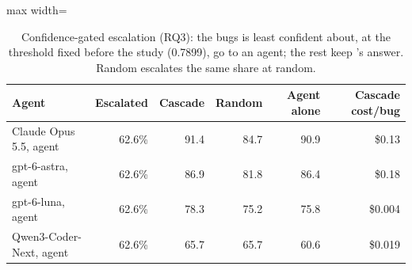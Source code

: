 \begin{table}[t]
\centering
\small
\caption{Confidence-gated escalation (RQ3): the bugs \tool{} is least confident about, at the threshold fixed before the study (0.7899), go to an agent; the rest keep \tool{}'s answer. Random escalates the same share at random.}
\label{tab:escalation-short}
\begin{adjustbox}{max width=\linewidth}\begin{tabular}{lrrrrr}
\toprule
Agent & Escalated & Cascade & Random & Agent alone & Cascade cost/bug \\
\midrule
Claude Opus 5.5, agent & 62.6\% & 91.4 & 84.7 & 90.9 & \$0.13 \\
gpt-6-astra, agent & 62.6\% & 86.9 & 81.8 & 86.4 & \$0.18 \\
gpt-6-luna, agent & 62.6\% & 78.3 & 75.2 & 75.8 & \$0.004 \\
Qwen3-Coder-Next, agent & 62.6\% & 65.7 & 65.7 & 60.6 & \$0.019 \\
\bottomrule
\end{tabular}\end{adjustbox}
\end{table}

